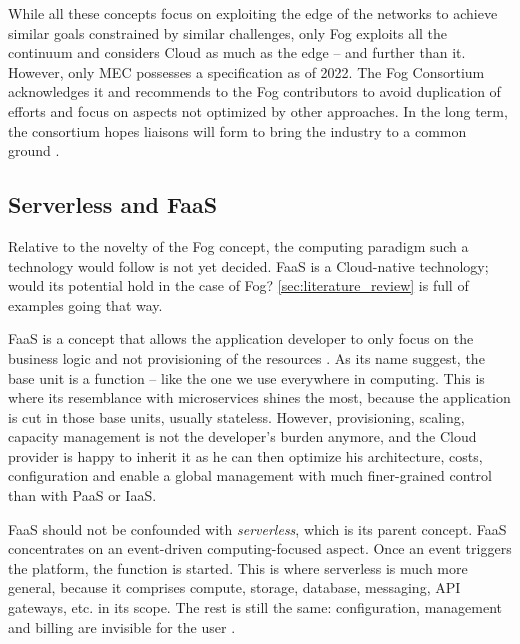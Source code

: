 \documentclass[11pt]{sdm}
\begin{document}
While all these concepts focus on exploiting the edge of the networks to achieve similar goals constrained by similar challenges, only Fog exploits all the continuum and considers Cloud as much as the edge -- and further than it. However, only \gls{MEC} possesses a specification as of 2022. The Fog Consortium acknowledges it and recommends to the Fog contributors to avoid duplication of efforts and focus on aspects not optimized by other approaches. In the long term, the consortium hopes liaisons will form to bring the industry to a common ground \cite{ieee_standards_association_ieee_2018}.

\hypersetup{linkcolor=}
\subsection{Serverless and \acrfull{FaaS}}

Relative to the novelty of the Fog concept, the computing paradigm such a technology would follow is not yet decided. \gls{FaaS} is a Cloud-native technology; would its potential hold in the case of Fog? \cref{sec:literature_review} is full of examples going that way.

\gls{FaaS} is a concept that allows the application developer to only focus on the business logic and not provisioning of the resources \cite{redhat_what_2020}. As its name suggest, the base unit is a function -- like the one we use everywhere in computing. This is where its resemblance with microservices shines the most, because the application is cut in those base units, usually stateless. However, provisioning, scaling, capacity management is not the developer's burden anymore, and the Cloud provider is happy to inherit it as he can then optimize his architecture, costs, configuration and enable a global management with much finer-grained control than with \gls{PaaS} or \gls{IaaS}.

\gls{FaaS} should not be confounded with \emph{serverless}, which is its parent concept. \gls{FaaS} concentrates on an event-driven computing-focused aspect. Once an event triggers the platform, the function is started. This is where serverless is much more general, because it comprises compute, storage, database, messaging, API gateways, etc. in its scope. The rest is still the same: configuration, management and billing are invisible for the user \cite{ibm_faas_2019}.
\end{document}
